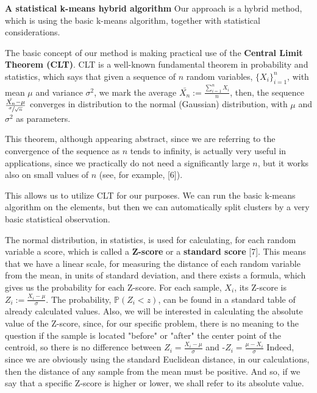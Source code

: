 \documentclass[12pt]{article}
\begin{document}
\newpage
\textbf{\large A statistical k-means hybrid algorithm} \newline
Our approach is a hybrid method, which is using the basic k-means algorithm, together with statistical considerations. \newline

The basic concept of our method is making practical use of the \textbf{Central Limit Theorem (CLT)}. \newline
CLT is a well-known fundamental theorem in probability and statistics, which says that given a sequence of $n$ random variables, \( \{X_i\}_{i=1}^n \), with mean $\mu$ and variance $\sigma^2$, we mark the average 
\( \bar{X_n}:=\frac{\sum_{i=1}^n X_i}{n} \), then,\newline
the sequence \( \frac{\bar{X_n}-\mu}{\sfrac{\sigma}{\sqrt{n}}} \) converges in distribution 
to the normal (Gaussian) distribution, with $\mu$ and $\sigma^2$ as parameters.

This theorem, although appearing abstract, since we are referring to the convergence of the sequence 
as $n$ tends to infinity, is actually very useful in applications, since we practically do not need a significantly large $n$, but it works also on small values of $n$ (see, for example, [6]).

This allows us to utilize CLT for our purposes. We can run the basic k-means algorithm on the elements, but then we can automatically split clusters by a very basic statistical observation.

The normal distribution, in statistics, is used for calculating, for each random variable a score, which is called a \textbf{Z-score} or a \textbf{standard score} [7]. This means that we have a linear scale, for measuring the distance of each random variable from the mean, in units of standard deviation, and there exists a formula, which gives us the probability for each Z-score.
For each sample, $X_i$, its Z-score is $Z_i:=\frac{X_i-\mu}{\sigma}$. The probability, $\mathbb{P}(Z_i < z)$, can be found in a standard table of already calculated values. \newline
Also, we will be interested in calculating the absolute value of the Z-score, since, for our specific problem, there is no meaning to the question if the sample is located "before" or "after" the center point of the centroid, so there is no difference between $Z_i=\frac{X_i-\mu}{\sigma}$ and -$Z_i=\frac{\mu-X_i}{\sigma}$ \newline
Indeed, since we are obviously using the standard Euclidean distance, in our calculations, then the distance of any sample from the mean must be positive.
\newline
And so, if we say that a specific Z-score is higher or lower, we shall refer to its absolute value. \newline
\end{document}
